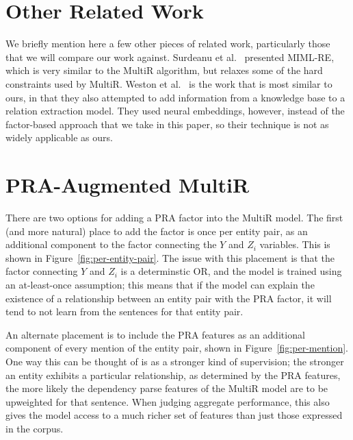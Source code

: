 \documentclass[11pt,a4paper]{article}
\newcommand{\figref}[1]{Figure~\ref{fig:#1}}
\begin{document}
\section{Other Related Work}
\label{sec:related-work}

We briefly mention here a few other pieces of related work, particularly those
that we will compare our work against.  Surdeanu et
al.~ presented MIML-RE, which is
very similar to the MultiR algorithm, but relaxes some of the hard constraints
used by MultiR.  Weston et
al.~ is the work that is most
similar to ours, in that they also attempted to add information from a
knowledge base to a relation extraction model.  They used neural embeddings,
however, instead of the factor-based approach that we take in this paper, so
their technique is not as widely applicable as ours.

\section{PRA-Augmented MultiR}
\label{sec:pra-augmented-multir}

There are two options for adding a PRA factor into the MultiR model.  The first
(and more natural) place to add the factor is once per entity pair, as an
additional component to the factor connecting the $Y$ and $Z_i$ variables.
This is shown in \figref{per-entity-pair}.  The issue with this placement is
that the factor connecting $Y$ and $Z_i$ is a determinstic OR, and the model is
trained using an at-least-once assumption; this means that if the model can
explain the existence of a relationship between an entity pair with the PRA
factor, it will tend to not learn from the sentences for that entity pair.

An alternate placement is to include the PRA features as an additional
component of every mention of the entity pair, shown in \figref{per-mention}.
One way this can be thought of is as a stronger kind of supervision; the
stronger an entity exhibits a particular relationship, as determined by the PRA
features, the more likely the dependency parse features of the MultiR model are
to be upweighted for that sentence.  When judging aggregate performance, this
also gives the model access to a much richer set of features than just those
expressed in the corpus.
\end{document}
